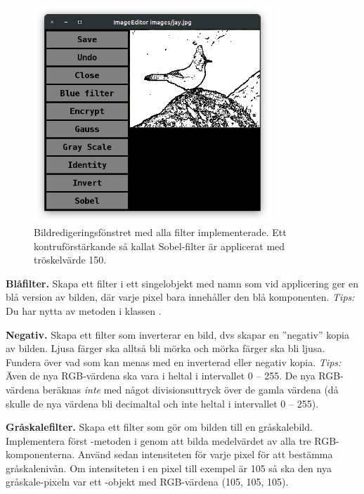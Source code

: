 \begin{figure}
\centering
\includegraphics[width=0.8\textwidth]{../img/w12-assignment-photo/photo-jay-sobel.png}
\caption{Bildredigeringsfönstret med alla filter implementerade. Ett kontruförstärkande så kallat Sobel-filter är applicerat med tröskelvärde 150.}
\label{photo:fig:photo-jay-sobel}
\end{figure}


\Task \textbf{Blåfilter.} Skapa ett filter i ett singelobjekt med namn  som vid applicering ger en blå version av bilden, där varje pixel bara innehåller den blå komponenten. \emph{Tips:} Du har nytta av metoden  i klassen . 

\Task \textbf{Negativ.} Skapa ett filter  som inverterar en bild, dvs skapar en ''negativ'' kopia av bilden. Ljusa färger ska alltså bli mörka och mörka färger ska bli ljusa.
Fundera över vad som kan menas med en inverterad eller negativ kopia. \emph{Tips:} Även de nya RGB-värdena ska vara i heltal i intervallet 0 -- 255. De nya RGB-värdena beräknas \emph{inte} med något divisionsuttryck över de gamla värdena (då skulle de nya värdena bli decimaltal och inte heltal i intervallet 0 -- 255). 

\Task \textbf{Gråskalefilter.} Skapa ett filter  som gör om bilden till en gråskalebild. Implementera först -metoden i  genom att bilda medelvärdet av alla tre RGB-komponenterna. Använd sedan intensiteten för varje pixel för att bestämma gråskalenivån. Om intensiteten i en pixel till exempel är 105 så ska den nya gråskale-pixeln var ett -objekt med RGB-värdena (105, 105, 105).

